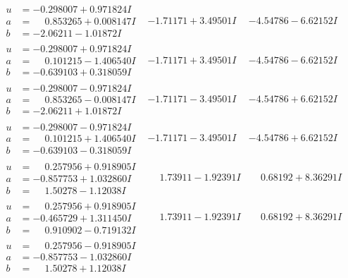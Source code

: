 \documentclass[1p]{elsarticle_modified}
\theoremstyle{definition}
\begin{document}
$$\begin{array}{c|c|c}
\begin{aligned}
u &= -0.298007 + 0.971824 I \\
a &= \phantom{-}0.853265 + 0.008147 I \\
b &= -2.06211 - 1.01872 I\end{aligned}
 & -1.71171 + 3.49501 I & -4.54786 - 6.62152 I \\ \hline\begin{aligned}
u &= -0.298007 + 0.971824 I \\
a &= \phantom{-}0.101215 - 1.406540 I \\
b &= -0.639103 + 0.318059 I\end{aligned}
 & -1.71171 + 3.49501 I & -4.54786 - 6.62152 I \\ \hline\begin{aligned}
u &= -0.298007 - 0.971824 I \\
a &= \phantom{-}0.853265 - 0.008147 I \\
b &= -2.06211 + 1.01872 I\end{aligned}
 & -1.71171 - 3.49501 I & -4.54786 + 6.62152 I \\ \hline\begin{aligned}
u &= -0.298007 - 0.971824 I \\
a &= \phantom{-}0.101215 + 1.406540 I \\
b &= -0.639103 - 0.318059 I\end{aligned}
 & -1.71171 - 3.49501 I & -4.54786 + 6.62152 I \\ \hline\begin{aligned}
u &= \phantom{-}0.257956 + 0.918905 I \\
a &= -0.857753 + 1.032860 I \\
b &= \phantom{-}1.50278 - 1.12038 I\end{aligned}
 & \phantom{-}1.73911 - 1.92391 I & \phantom{-}0.68192 + 8.36291 I \\ \hline\begin{aligned}
u &= \phantom{-}0.257956 + 0.918905 I \\
a &= -0.465729 + 1.311450 I \\
b &= \phantom{-}0.910902 - 0.719132 I\end{aligned}
 & \phantom{-}1.73911 - 1.92391 I & \phantom{-}0.68192 + 8.36291 I \\ \hline\begin{aligned}
u &= \phantom{-}0.257956 - 0.918905 I \\
a &= -0.857753 - 1.032860 I \\
b &= \phantom{-}1.50278 + 1.12038 I\end{aligned}

\end{array}$$
\end{document}
